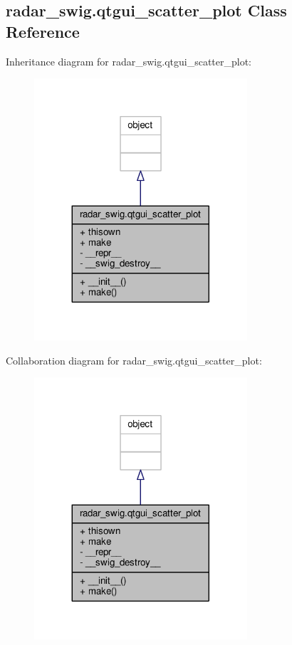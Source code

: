 \subsection{radar\+\_\+swig.\+qtgui\+\_\+scatter\+\_\+plot Class Reference}
\label{classradar__swig_1_1qtgui__scatter__plot}


Inheritance diagram for radar\+\_\+swig.\+qtgui\+\_\+scatter\+\_\+plot\+:
\nopagebreak
\begin{figure}[H]
\begin{center}
\leavevmode
\includegraphics[width=224pt]{de/da7/classradar__swig_1_1qtgui__scatter__plot__inherit__graph}
\end{center}
\end{figure}


Collaboration diagram for radar\+\_\+swig.\+qtgui\+\_\+scatter\+\_\+plot\+:
\nopagebreak
\begin{figure}[H]
\begin{center}
\leavevmode
\includegraphics[width=224pt]{de/da0/classradar__swig_1_1qtgui__scatter__plot__coll__graph}
\end{center}
\end{figure}
